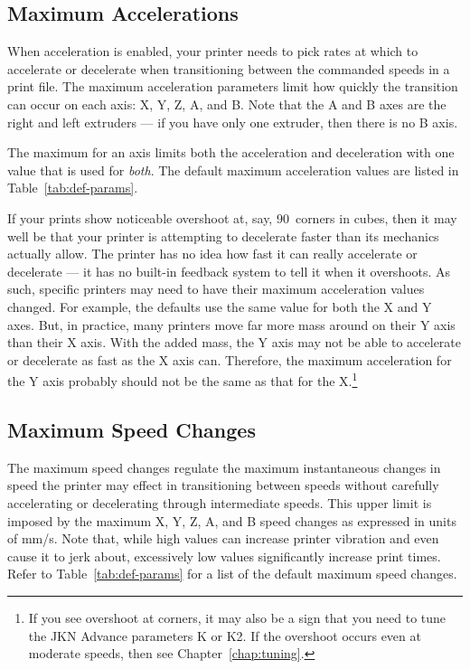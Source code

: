 
\subsection{Maximum Accelerations} \label{sec:maxaccels}

When acceleration is enabled, your printer needs to pick rates at which to accelerate or decelerate when transitioning between the commanded speeds in a print file.  The maximum acceleration parameters limit how quickly the transition can occur on each axis: X, Y, Z, A, and B.  Note that the A and B axes are the right and left extruders --- if you have only one extruder, then there is no B axis.

The maximum for an axis limits both the acceleration and deceleration with one value that is used for \emph{both}.  The default maximum acceleration values are listed in Table~\ref{tab:def-params}.

If your prints show noticeable overshoot at, say, 90\textdegree\ corners in cubes, then it may well be that your printer is attempting to decelerate faster than its mechanics actually allow.  The printer has no idea how fast it can really accelerate or decelerate --- it has no built-in feedback system to tell it when it overshoots.  As such, specific printers may need to have their maximum acceleration values changed.  For example, the defaults use the same value for both the X and Y axes.  But, in practice, many printers move far more mass around on their Y axis than their X axis.  With the added mass, the Y axis may not be able to accelerate or decelerate as fast as the X axis can.  Therefore, the maximum acceleration for the Y axis probably should not be the same as that for the X.\footnote{If you see overshoot at corners, it may also be a sign that you need to tune the JKN Advance parameters K or K2.  If the overshoot occurs even at moderate speeds, then see Chapter~\ref{chap:tuning}.}


\subsection{Maximum Speed Changes} \label{sec:maxspeedchanges}

The maximum speed changes regulate the maximum instantaneous changes in speed the printer may effect in transitioning between speeds without carefully accelerating or decelerating through intermediate speeds.  This upper limit is imposed by the maximum X, Y, Z, A, and B speed changes as expressed in units of mm/s.  Note that, while high values can increase printer vibration and even cause it to jerk about, excessively low values significantly increase print times.  Refer to Table~\ref{tab:def-params} for a list of the default maximum speed changes.

